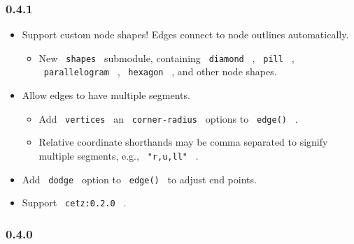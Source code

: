 \subsubsection{0.4.1}\label{section-7}

\begin{itemize}
\tightlist
\item
  Support custom node shapes! Edges connect to node outlines
  automatically.

  \begin{itemize}
  \tightlist
  \item
    New \texttt{\ shapes\ } submodule, containing \texttt{\ diamond\ } ,
    \texttt{\ pill\ } , \texttt{\ parallelogram\ } ,
    \texttt{\ hexagon\ } , and other node shapes.
  \end{itemize}
\item
  Allow edges to have multiple segments.

  \begin{itemize}
  \tightlist
  \item
    Add \texttt{\ vertices\ } an \texttt{\ corner-radius\ } options to
    \texttt{\ edge()\ } .
  \item
    Relative coordinate shorthands may be comma separated to signify
    multiple segments, e.g., \texttt{\ "r,u,ll"\ } .
  \end{itemize}
\item
  Add \texttt{\ dodge\ } option to \texttt{\ edge()\ } to adjust end
  points.
\item
  Support \texttt{\ cetz:0.2.0\ } .
\end{itemize}

\subsubsection{0.4.0}\label{section-8}

